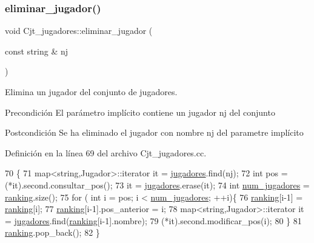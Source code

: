 \subsubsection{\texorpdfstring{eliminar\+\_\+jugador()}{eliminar\_jugador()}}
{\footnotesize\ttfamily void Cjt\+\_\+jugadores\+::eliminar\+\_\+jugador (\begin{DoxyParamCaption}\item[{const string \&}]{nj }\end{DoxyParamCaption})}



Elimina un jugador del conjunto de jugadores. 

\begin{DoxyPrecond}{Precondición}
El parámetro implícito contiene un jugador nj del conjunto 
\end{DoxyPrecond}
\begin{DoxyPostcond}{Postcondición}
Se ha eliminado el jugador con nombre nj del parametre implícito 
\end{DoxyPostcond}


Definición en la línea 69 del archivo Cjt\+\_\+jugadores.\+cc.


\begin{DoxyCode}
70 \{
71   map<string,Jugador>::iterator it = \hyperlink{class_cjt__jugadores_ae3fc5f98e0f343b039bd7dff0e616ecc}{jugadores}.find(nj);
72   \textcolor{keywordtype}{int} pos = (*it).second.consultar\_pos();
73   it = \hyperlink{class_cjt__jugadores_ae3fc5f98e0f343b039bd7dff0e616ecc}{jugadores}.erase(it);
74   \textcolor{keywordtype}{int} \hyperlink{class_cjt__jugadores_a4951d7691e67c44415fdcb3119dd4148}{num\_jugadores} = \hyperlink{class_cjt__jugadores_a2a64dd6a0c9315af038dfdb4c27da059}{ranking}.size();
75   \textcolor{keywordflow}{for} ( \textcolor{keywordtype}{int} i = pos; i < \hyperlink{class_cjt__jugadores_a4951d7691e67c44415fdcb3119dd4148}{num\_jugadores}; ++i)\{
76     \hyperlink{class_cjt__jugadores_a2a64dd6a0c9315af038dfdb4c27da059}{ranking}[i-1] = \hyperlink{class_cjt__jugadores_a2a64dd6a0c9315af038dfdb4c27da059}{ranking}[i];
77     \hyperlink{class_cjt__jugadores_a2a64dd6a0c9315af038dfdb4c27da059}{ranking}[i-1].pos\_anterior = i;
78     map<string,Jugador>::iterator it = \hyperlink{class_cjt__jugadores_ae3fc5f98e0f343b039bd7dff0e616ecc}{jugadores}.find(\hyperlink{class_cjt__jugadores_a2a64dd6a0c9315af038dfdb4c27da059}{ranking}[i-1].nombre);
79     (*it).second.modificar\_pos(i);
80   \}
81   \hyperlink{class_cjt__jugadores_a2a64dd6a0c9315af038dfdb4c27da059}{ranking}.pop\_back();
82 \}
\end{DoxyCode}
\mbox{\label{class_cjt__jugadores_a1940533810f2ea0b82c9a409b9ce6fab}} 
